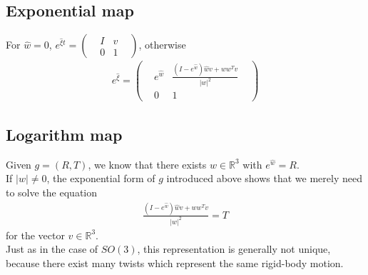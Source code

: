 \documentclass{report}
\begin{document}
\subsection{Exponential map}
For $\hat{w} = 0$, $e^{\hat{\xi} t} = \left( 
\begin{matrix}
&I &v& \\
&0 &1&    
\end{matrix}
\right)$, otherwise
\begin{align}
    e^{\hat{\xi}} = \left( 
        \begin{matrix}
        &e^{\hat{w}} &\frac{(I-e^{\hat{w}})\hat{w}v+ww^Tv}{|w|^2}& \\
        &0 &1&    
        \end{matrix}
        \right)
\end{align}

\subsection{Logarithm map}
Given $g = (R, T)$, we know that there exists $w \in \mathbb{R}^3$ with $e^{\hat{w}} = R$. \\
If $|w| \neq 0$, the exponential form of $g$ introduced above shows that we merely need to solve the equation
\begin{align}
    \frac{(I-e^{\hat{w}})\hat{w}v+ww^Tv}{|w|^2} = T
\end{align}
for the vector $v \in \mathbb{R}^3$.\\
Just as in the case of $SO(3)$, this representation is generally not unique, because there exist many
twists which represent the same rigid-body motion.



\end{document}
